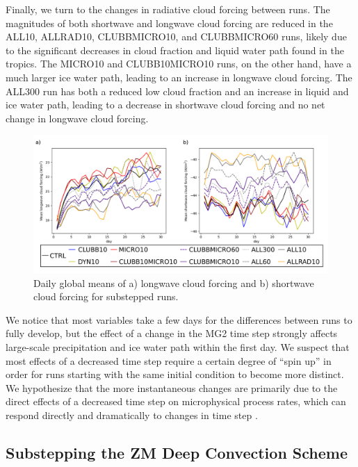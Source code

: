 \documentclass [11pt, proquest] {uwthesis}[2020/02/24]
\begin{document}
Finally, we turn to the changes in radiative cloud forcing between runs. The magnitudes of both shortwave and longwave cloud forcing are reduced in the ALL10, ALLRAD10, CLUBBMICRO10, and CLUBBMICRO60 runs, likely due to the significant decreases in cloud fraction and liquid water path found in the tropics. The MICRO10 and CLUBB10MICRO10 runs, on the other hand, have a much larger ice water path, leading to an increase in longwave cloud forcing. The ALL300 run has both a reduced low cloud fraction and an increase in liquid and ice water path, leading to a decrease in shortwave cloud forcing and no net change in longwave cloud forcing.

\begin{figure}
    \centering
    \includegraphics[width=6.5in]{Figure12.png}
    \caption[Radiative cloud forcing over time for short EAMv1 runs using different forms of substepping]{Daily global means of a) longwave cloud forcing and b) shortwave cloud forcing for substepped runs.}
    \label{fig:cld-frc}
\end{figure}

We notice that most variables take a few days for the differences between runs to fully develop, but the effect of a change in the MG2 time step strongly affects large-scale precipitation and ice water path within the first day. We suspect that most effects of a decreased time step require a certain degree of ``spin up'' in order for runs starting with the same initial condition to become more distinct. We hypothesize that the more instantaneous changes are primarily due to the direct effects of a decreased time step on microphysical process rates, which can respond directly and dramatically to changes in time step \parencite{Santos2020}.

\subsection{Substepping the ZM Deep Convection Scheme}
\end{document}
